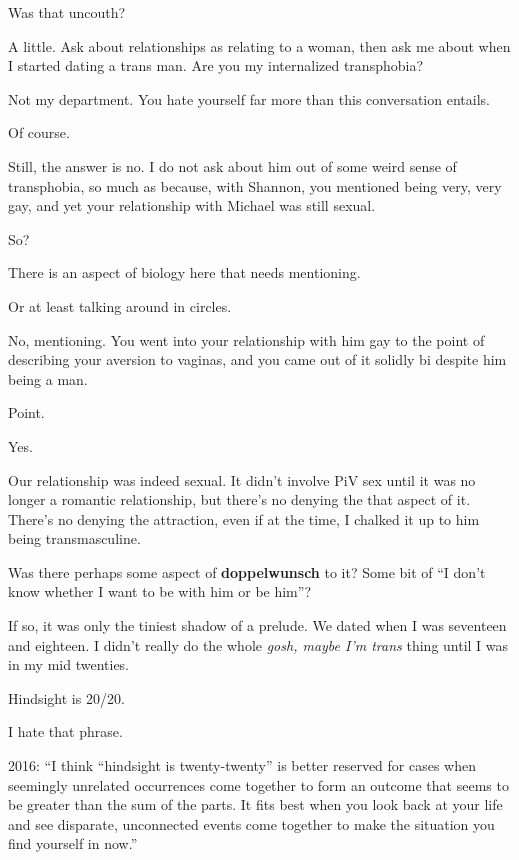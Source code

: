 \begin{paracol}{2}
\begin{leftcolumn}
\begin{ally}
Was that uncouth?
\end{ally}
A little. Ask about relationships as relating to a woman, then ask me about when I started dating a trans man. Are you my internalized transphobia?

\begin{ally}
Not my department. You hate yourself far more than this conversation entails.
\end{ally}
Of course.

\begin{ally}
Still, the answer is no. I do not ask about him out of some weird sense of transphobia, so much as because, with Shannon, you mentioned being very, very gay, and yet your relationship with Michael was still sexual.
\end{ally}
So?

\begin{ally}
There is an aspect of biology here that needs mentioning.
\end{ally}
Or at least talking around in circles.

\begin{ally}
No, mentioning. You went into your relationship with him gay to the point of describing your aversion to vaginas, and you came out of it solidly bi despite him being a man.
\end{ally}
Point.

\begin{ally}
Yes.
\end{ally}
Our relationship was indeed sexual. It didn't involve PiV sex until it was no longer a romantic relationship, but there's no denying the that aspect of it. There's no denying the attraction, even if at the time, I chalked it up to him being transmasculine.

\begin{ally}
Was there perhaps some aspect of \textbf{doppelwunsch} to it? Some bit of ``I don't know whether I want to be with him or be him''?
\end{ally}
If so, it was only the tiniest shadow of a prelude. We dated when I was seventeen and eighteen. I didn't really do the whole \emph{gosh, maybe I'm trans} thing until I was in my mid twenties.

\begin{ally}
Hindsight is 20/20.
\end{ally}
I hate that phrase.

\begin{ally}
2016: ``I think ``hindsight is twenty-twenty'' is better reserved for cases when seemingly unrelated occurrences come together to form an outcome that seems to be greater than the sum of the parts. It fits best when you look back at your life and see disparate, unconnected events come together to make the situation you find yourself in now.''
\end{ally}
\end{leftcolumn}
\end{paracol}

